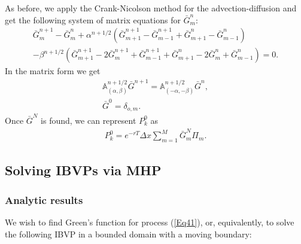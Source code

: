\documentclass{article}
\begin{document}
As before, we apply the Crank-Nicolson method for the advection-diffusion
and get the following system of matrix equations for $\bar{G}_{m}^{n}$:%
\begin{equation}
\begin{array}{c}
\bar{G}_{m}^{n+1}-\bar{G}_{m}^{n}+\alpha ^{n+1/2}\left( \bar{G}_{m+1}^{n+1}-%
\bar{G}_{m-1}^{n+1}+\bar{G}_{m+1}^{n}-\bar{G}_{m-1}^{n}\right) \\ 
-\beta ^{n+1/2}\left( \bar{G}_{m+1}^{n+1}-2\bar{G}_{m}^{n+1}+\bar{G}%
_{m-1}^{n+1}+\bar{G}_{m+1}^{n}-2\bar{G}_{m}^{n}+\bar{G}_{m-1}^{n}\right) =0.%
\end{array}
\label{Eq54}
\end{equation}%
In the matrix form we get%
\begin{equation}
\begin{array}{c}
\mathbb{A}_{\left( \alpha ,\beta \right) }^{n+1/2}\bar{G}^{n+1}=\mathbb{A}%
_{\left( -\alpha ,-\beta \right) }^{n+1/2}\bar{G}^{n}, \\ 
\bar{G}^{0}=\delta _{o,m}.%
\end{array}
\label{Eq55}
\end{equation}%
Once $\bar{G}^{N}$ is found, we can represent $P_{k}^{0}$ as%
\begin{equation}
\begin{array}{c}
P_{k}^{0}=e^{-rT}\Delta x\sum\limits_{m=1}^{M}\bar{G}_{m}^{N}\Pi _{m}.%
\end{array}
\label{Eq56}
\end{equation}

\subsection{Solving IBVPs via MHP\label{Sec42}}

\subsubsection{Analytic results}

We wish to find Green's function for process (\ref{Eq41}), or, equivalently,
to solve the following IBVP in a bounded domain with a moving boundary:
\end{document}
